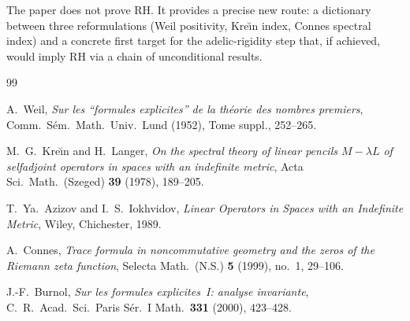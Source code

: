 \documentclass[11pt]{amsart}
\begin{document}
The paper does not prove RH.  It provides a precise new route: a dictionary between
three reformulations (Weil positivity, Kre\u{\i}n index, Connes spectral index) and
a concrete first target for the adelic-rigidity step that, if achieved, would imply RH via a chain
of unconditional results.

\begin{thebibliography}{99}

A.~Weil,
\textit{Sur les ``formules explicites'' de la th\'eorie des nombres premiers},
Comm.~S\'em.\ Math.\ Univ.\ Lund (1952), Tome suppl., 252--265.

M.~G.~Kre\u{\i}n and H.~Langer,
\textit{On the spectral theory of linear pencils $M - \lambda L$ of selfadjoint operators
in spaces with an indefinite metric},
Acta Sci.\ Math.\ (Szeged) \textbf{39} (1978), 189--205.

T.~Ya.~Azizov and I.~S.~Iokhvidov,
\textit{Linear Operators in Spaces with an Indefinite Metric},
Wiley, Chichester, 1989.

A.~Connes,
\textit{Trace formula in noncommutative geometry and the zeros of the Riemann zeta function},
Selecta Math.\ (N.S.) \textbf{5} (1999), no.~1, 29--106.

J.-F.~Burnol,
\textit{Sur les formules explicites~I: analyse invariante},
C.~R.\ Acad.\ Sci.\ Paris S\'er.~I Math.\ \textbf{331} (2000), 423--428.

\end{thebibliography}
\end{document}
